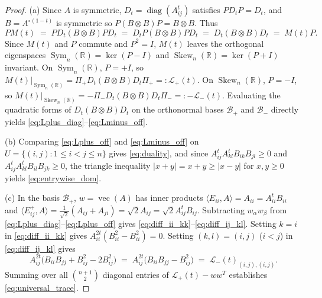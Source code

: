\documentclass[11pt,a4paper]{article}
\theoremstyle{plain}
\theoremstyle{definition}
\theoremstyle{remark}
\DeclareMathOperator{\Sym}{Sym}
\DeclareMathOperator{\Skew}{Skew}
\DeclareMathOperator{\vecop}{vec}
\DeclareMathOperator{\diag}{diag}
\begin{document}
\begin{proof}
(a) Since $A$ is symmetric, $D_t = \diag(A_{ij}^t)$ satisfies $P D_t P = D_t$, and $B = A^{\circ(1-t)}$ is symmetric so $P(B \otimes B)P = B \otimes B$. Thus
\[
  P M(t) \;=\; P D_t (B \otimes B) P D_t \;=\; D_t P (B \otimes B) P D_t \;=\; D_t (B \otimes B) D_t \;=\; M(t) P.
\]
Since $M(t)$ and $P$ commute and $P^2 = I$, $M(t)$ leaves the orthogonal eigenspaces $\Sym_n(\mathbb{R}) = \ker(P - I)$ and $\Skew_n(\mathbb{R}) = \ker(P + I)$ invariant. On $\Sym_n(\mathbb{R})$, $P = +I$, so $M(t)|_{\Sym_n(\mathbb{R})} = \Pi_+ D_t (B \otimes B) D_t \Pi_+ =: \mathcal{L}_+(t)$. On $\Skew_n(\mathbb{R})$, $P = -I$, so $M(t)|_{\Skew_n(\mathbb{R})} = -\Pi_- D_t (B \otimes B) D_t \Pi_- =: -\mathcal{L}_-(t)$. Evaluating the quadratic forms of $D_t(B \otimes B)D_t$ on the orthonormal bases $\mathcal{B}_+$ and $\mathcal{B}_-$ directly yields \eqref{eq:Lplus_diag}--\eqref{eq:Lminus_off}.

(b) Comparing \eqref{eq:Lplus_off} and \eqref{eq:Lminus_off} on $U = \{(i,j) : 1 \le i < j \le n\}$ gives \eqref{eq:duality}, and since $A_{ij}^t A_{kl}^t B_{ik} B_{jl} \ge 0$ and $A_{ij}^t A_{kl}^t B_{il} B_{jk} \ge 0$, the triangle inequality $|x + y| = x + y \ge |x - y|$ for $x, y \ge 0$ yields \eqref{eq:entrywise_dom}.

(c) In the basis $\mathcal{B}_+$, $w = \vecop(A)$ has inner products $\langle E_{ii}, A \rangle = A_{ii} = A_{ii}^t B_{ii}$ and $\langle E_{ij}^+, A \rangle = \frac{1}{\sqrt{2}}(A_{ij} + A_{ji}) = \sqrt{2} A_{ij} = \sqrt{2} A_{ij}^t B_{ij}$. Subtracting $w_\alpha w_\beta$ from \eqref{eq:Lplus_diag}--\eqref{eq:Lplus_off} gives \eqref{eq:diff_ii_kk}--\eqref{eq:diff_ij_kl}. Setting $k = i$ in \eqref{eq:diff_ii_kk} gives $A_{ii}^{2t}(B_{ii}^2 - B_{ii}^2) = 0$. Setting $(k,l) = (i,j)$ ($i < j$) in \eqref{eq:diff_ij_kl} gives
\[
  A_{ij}^{2t}\big(B_{ii}B_{jj} + B_{ij}^2 - 2 B_{ij}^2\big) \;=\; A_{ij}^{2t}\big(B_{ii}B_{jj} - B_{ij}^2\big) \;=\; \mathcal{L}_-(t)_{(i,j),(i,j)}.
\]
Summing over all $\binom{n+1}{2}$ diagonal entries of $\mathcal{L}_+(t) - w w^T$ establishes \eqref{eq:universal_trace}.
\end{proof}
\end{document}
